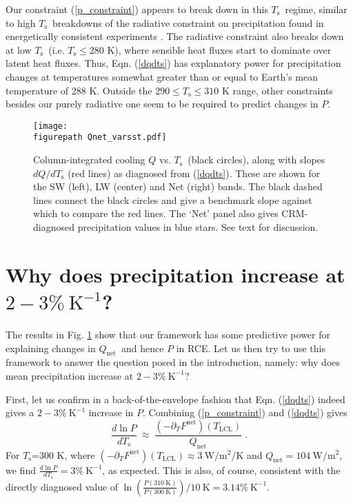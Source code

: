 \documentclass[9pt,twocolumn,twoside,lineno]{pnas-new}
\newcommand{\beqn}{\begin{equation}}
\newcommand{\eeqn}{\end{equation}}
\newcommand{\eqnref}[1]{(\ref{#1})}
\newcommand{\ppt}{\ensuremath{\partial_T}}
\newcommand{\Qnet}{\ensuremath{Q_\mathrm{net}}}
\newcommand{\Fnet}{\ensuremath{F^\mathrm{net}}}
\newcommand{\Wmsq}{\ensuremath{\mathrm{W/m^2}}}
\newcommand{\Kinverse}{\ensuremath{\mathrm{K^{-1}}}}
\newcommand{\Kelvin}{\ensuremath{\mathrm{K}}}
\newcommand{\Ts}{\ensuremath{T_\mathrm{s}}}
\newcommand{\Tlcl}{\ensuremath{T_\mathrm{LCL}}}
\newcommand{\figurepath}{../../figures/}
\begin{document}
Our constraint \eqnref{p_constraint} appears to break down in this  \Ts\ regime, similar to high \Ts\ breakdowns of the radiative constraint on precipitation found in energetically consistent experiments \cite{lehir2009, pierrehumbert2002}.  The radiative  constraint  also breaks down at low \Ts\ (i.e. $\Ts \leq 280$ K), where sensible heat fluxes start to dominate over latent heat fluxes. Thus, Eqn. \eqnref{dqdts} has explanatory power for  precipitation changes at  temperatures somewhat greater than or equal to Earth's mean temperature of 288 K. Outside the $290\leq \Ts \leq 310$ K range, other constraints besides our purely radiative one seem to be required to predict changes in $P$.

\begin{figure}[t]
	\begin{center}
			\texttt{[image: \\figurepath Qnet\_varsst.pdf]}
		\caption{Column-integrated cooling $Q$ vs. \Ts\ (black circles), along with slopes $d Q/d \Ts$ (red lines) as diagnosed from \eqnref{dqdts}. These are shown for the SW (left), LW (center) and Net (right) bands.  The black dashed lines connect the black circles and give a benchmark slope against which to compare the red lines. The `Net' panel also gives CRM-diagnosed precipitation values in blue stars. See text for discussion.
		\label{Qnet_varsst}
		}
	\end{center}
\end{figure}



\section{Why does precipitation increase at $2 -3\%\ \Kinverse$?} \label{sec_1percent}
The results in Fig. \ref{Qnet_varsst} show that our framework  has some predictive power for explaining changes in \Qnet\ and hence $P$ in RCE. Let us then try to use this framework to answer the question posed in the introduction, namely: why does mean precipitation increase at $2 -3\%\ \Kinverse$?

First, let us confirm in a back-of-the-envelope fashion that Eqn. \eqnref{dqdts} indeed gives a $2 -3\%\ \Kinverse$ increase in $P$. Combining \eqnref{p_constraint} and \eqnref{dqdts} gives
	\beqn
		\frac{d \ln  P}{d \Ts} \ \approx\  \frac{(-\ppt \Fnet)(\Tlcl)}{\Qnet} \; .
	\label{precip_estimate}
	\eeqn
For \Ts=300 K, where $(-\ppt \Fnet)(\Tlcl) \approx 3 \ \Wmsq/\mathrm{K}$ and $\Qnet =  104\ \Wmsq$, we find $\frac{d \ln  P}{d \Ts}=  3\%\ \Kinverse$, as expected.  This is also, of course, consistent with the directly diagnosed value of $\ln\left(\frac{P(310\ \Kelvin)}{P(300\ \Kelvin)}\right)/10\ \Kelvin = 3.14 \%\  \Kinverse$.
\end{document}
